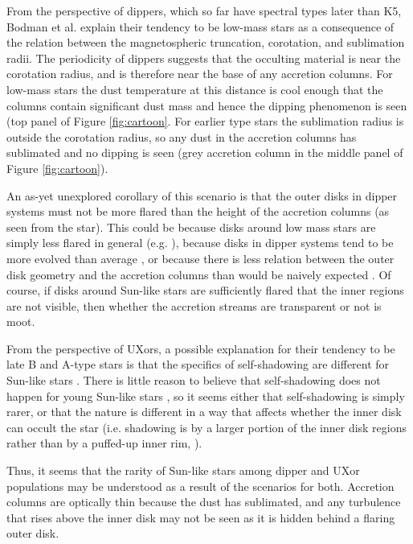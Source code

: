 \documentclass[]{rsos}
\begin{document}
From the perspective of dippers, which so far have spectral types later than K5, Bodman
et al.  \cite{2016arXiv160503985B} explain their tendency to be low-mass stars as a
consequence of the relation between the magnetospheric truncation, corotation, and
sublimation radii. The periodicity of dippers suggests that the occulting material is
near the corotation radius, and is therefore near the base of any accretion columns. For
low-mass stars the dust temperature at this distance is cool enough that the columns
contain significant dust mass and hence the dipping phenomenon is seen (top panel of
Figure \ref{fig:cartoon}. For earlier type stars the sublimation radius is outside the
corotation radius, so any dust in the accretion columns has sublimated and no dipping is
seen (grey accretion column in the middle panel of Figure \ref{fig:cartoon}).

An as-yet unexplored corollary of this scenario is that the outer disks in dipper systems
must not be more flared than the height of the accretion columns (as seen from the
star). This could be because disks around low mass stars are simply less flared in
general (e.g. \cite{2010ApJ...720.1668S}), because disks in dipper systems tend to be
more evolved than average \cite{2016ApJ...816...69A}, or because there is less relation
between the outer disk geometry and the accretion columns than would be naively expected
\cite{2016MNRAS.462L.101A}. Of course, if disks around Sun-like stars are sufficiently
flared that the inner regions are not visible, then whether the accretion streams are
transparent or not is moot.

From the perspective of UXors, a possible explanation for their tendency to be late B and
A-type stars is that the specifics of self-shadowing are different for Sun-like stars
\cite{2003ApJ...594L..47D}. There is little reason to believe that self-shadowing does
not happen for young Sun-like stars \cite{1987ApJ...323..714K,2004A&A...421.1075D}, so it
seems either that self-shadowing is simply rarer, or that the nature is different in a
way that affects whether the inner disk can occult the star (i.e. shadowing is by a
larger portion of the inner disk regions rather than by a puffed-up inner rim,
\cite{2004A&A...421.1075D,2007prpl.conf..555D}).

Thus, it seems that the rarity of Sun-like stars among dipper and UXor populations may be
understood as a result of the scenarios for both. Accretion columns are optically thin
because the dust has sublimated, and any turbulence that rises above the inner disk may
not be seen as it is hidden behind a flaring outer disk.
\end{document}
